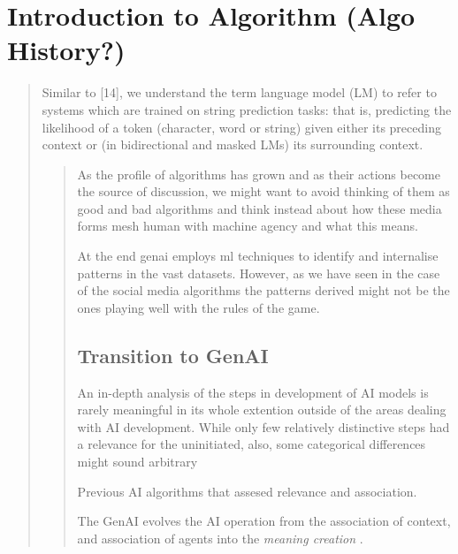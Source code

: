 \section{Introduction to Algorithm (Algo History?)}\label{sec:Introduction to Algorithm} %

\begin{quote}
Similar to [14], we understand the term language model (LM) to refer to systems which are trained on string prediction tasks: that is, predicting the likelihood of a token (character, word or string) given either its preceding context or (in bidirectional and masked LMs) its surrounding context. \cite[610]{bender2021b}
\begin{quote}

As the profile of algorithms has grown and as their actions become the source of discussion, we might want to avoid thinking of them as good and bad algorithms and think instead about how these media forms mesh human with machine agency and what this means.

At the end \gls{genai} employs \gls{ml} techniques to identify and internalise patterns in the vast datasets. However, as we have seen in the case of the social media algorithms the patterns derived might not be the ones playing well with the rules of the game.

\subsection{Transition to GenAI}\label{sec:Transition to GenAI} %

An in-depth analysis of the steps in development of AI models is rarely
meaningful in its whole extention outside of the areas dealing with AI development.
While only few relatively distinctive steps had a relevance for the
uninitiated, also, some categorical differences might sound arbitrary

Previous AI algorithms that assesed relevance and association.

The GenAI evolves the AI operation from the association of context, and
association of agents into the \emph{meaning creation}
\parencite[964]{dishon2024}.


\end{quote}
\end{quote}
